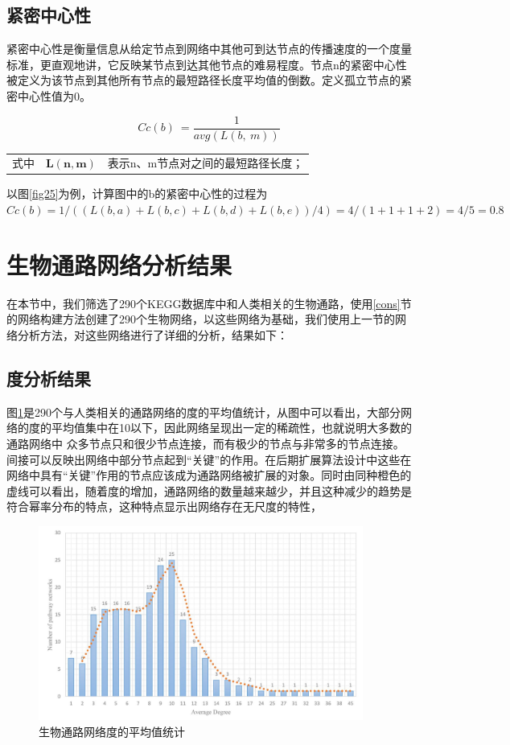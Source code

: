 \subsection{紧密中心性}
紧密中心性是衡量信息从给定节点到网络中其他可到达节点的传播速度的一个度量标准，更直观地讲，它反映某节点到达其他节点的难易程度。节点n的紧密中心性被定义为该节点到其他所有节点的最短路径长度平均值的倒数。定义孤立节点的紧密中心性值为0。

\begin{equation}\label{eq27}
	Cc( b) \ =\frac{1}{avg( L( b,\ m))}
\end{equation}

\begin{tabularx}{\textwidth}{@{}l@{\quad}r@{———}X@{}}
式中 & $\boldsymbol{L(n, m)}$ &  表示n、m节点对之间的最短路径长度；\\
\end{tabularx}\vspace{3.15bp}
以图\ref{fig25}为例，计算图中的b的紧密中心性的过程为$Cc(b) = 1/ ( (L(b, a) + L(b, c) + L(b, d) + L(b, e)) / 4) = 4/ (1 + 1 + 1 + 2) = 4/5= 0.8$

\section{生物通路网络分析结果}
在本节中，我们筛选了290个KEGG\cite{kanehisa2008kegg}数据库中和人类相关的生物通路，使用\ref{cons}节的网络构建方法创建了290个生物网络，以这些网络为基础，我们使用上一节的网络分析方法，对这些网络进行了详细的分析，结果如下：
\subsection{度分析结果}
图\ref{fig26}是290个与人类相关的通路网络的度的平均值统计，从图中可以看出，大部分网络的度的平均值集中在10以下，因此网络呈现出一定的稀疏性，也就说明大多数的通路网络中 众多节点只和很少节点连接，而有极少的节点与非常多的节点连接。间接可以反映出网络中部分节点起到“关键”的作用。在后期扩展算法设计中这些在网络中具有“关键”作用的节点应该成为通路网络被扩展的对象。同时由同种橙色的虚线可以看出，随着度的增加，通路网络的数量越来越少，并且这种减少的趋势是符合幂率分布的特点，这种特点显示出网络存在无尺度的特性，

\begin{figure}[h]
\centering
\includegraphics[width = 0.95\textwidth]{degree_dis}
\caption[fig26]{生物通路网络度的平均值统计}
\label{fig26}
\end{figure}

